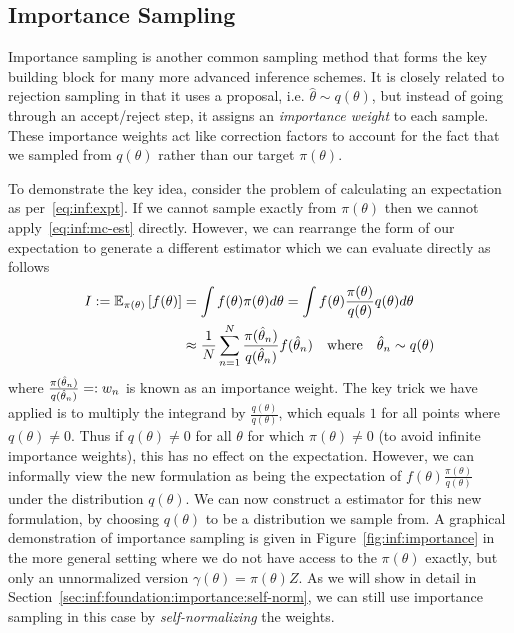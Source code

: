 
\subsection{Importance Sampling}
\label{sec:inf:foundation:importance}

Importance sampling is another common sampling method that forms the key building block
for many more advanced inference schemes.  It is closely related to rejection sampling in that
it uses a proposal, i.e. $\hat{\theta}\sim q(\theta)$, but instead of going
through an accept/reject step, it assigns an \emph{importance weight} to each sample.
These importance weights act like correction factors to account for the fact that we sampled
from $q(\theta)$ rather than our target $\pi(\theta)$.

To demonstrate the key idea, consider the problem of calculating an expectation as
per~\eqref{eq:inf:expt}.  If we cannot sample exactly from $\pi(\theta)$ then we cannot
apply~\eqref{eq:inf:mc-est} directly.  However, we can rearrange the form of our expectation
to generate a different \mc estimator which we can evaluate directly as follows
\begin{align}
	I:=\mathbb{E}_{\pi(\theta)} \left[f(\theta)\right] &=\int f(\theta) \pi(\theta) d\theta 
	= \int f(\theta) \frac{\pi(\theta)}{q(\theta)} q(\theta) d\theta \nonumber \\
	&\approx \frac{1}{N} \sum_{n=1}^{N} \frac{\pi(\hat{\theta}_n)}{q(\hat{\theta}_n)} f(\hat{\theta}_n)
	\quad \text{where} \quad \hat{\theta}_n \sim q(\theta) 	\label{eq:inf:importance}
\end{align}
where $\frac{\pi(\hat{\theta}_n)}{q(\hat{\theta}_n)} =: w_n$ is known as an importance weight.
The key trick we have applied is to multiply the integrand by $\frac{q(\theta)}{q(\theta)}$, which
equals $1$
for all points where $q(\theta) \neq 0$.  Thus if $q(\theta) \neq 0$ for all $\theta$ for which
$\pi(\theta) \neq 0$ (to avoid infinite importance weights), this has no effect on the 
expectation.  However, we can informally view the new
formulation as being the expectation of $f(\theta) \frac{\pi(\theta)}{q(\theta)}$ under the
distribution $q(\theta)$.  We can now construct a \mc estimator for this new formulation, 
by choosing $q(\theta)$ to be a distribution we sample from.  A graphical
demonstration of importance sampling is given in Figure~\ref{fig:inf:importance} in the
more general setting where we do not have access to the $\pi(\theta)$ exactly, but only
an unnormalized version $\gamma(\theta)=\pi(\theta)Z$.  As we will show in detail in
Section~\ref{sec:inf:foundation:importance:self-norm}, we can still use importance sampling
in this case by \emph{self-normalizing} the weights.

